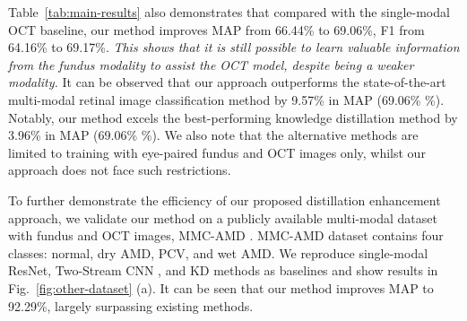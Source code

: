 \documentclass[runningheads]{llncs}
\newcommand{\wdaicmnt}[1]{{\color[rgb]{0.9,0.1,0.1}{(WD:#1)}}}
\newcommand{\xmli}[1]{{\color{red}{[XM: #1]}}}
\begin{document}
Table~\ref{tab:main-results} also demonstrates that compared with the single-modal OCT baseline, our method improves MAP from 66.44\% to 69.06\%, F1 from 64.16\% to 69.17\%.
\textit{This shows that it is still possible to learn valuable information from the fundus modality to assist the OCT model, despite being a weaker modality.} It can be observed that our approach outperforms the state-of-the-art multi-modal retinal image classification method \cite{he2021multi} by 9.57\% in MAP (69.06\% \%). Notably, our method excels the best-performing knowledge distillation method \cite{chen2022knowledge} by 3.96\% in MAP (69.06\% \%).
We also note that the alternative methods are limited to training with eye-paired fundus and OCT images only, whilst our approach does not face such restrictions.

To further demonstrate the efficiency of our proposed distillation enhancement approach, we validate our method on a publicly available multi-modal dataset with fundus and OCT images, MMC-AMD \cite{wang2022learning}. MMC-AMD dataset contains four classes: normal, dry AMD, PCV, and wet AMD. We reproduce single-modal ResNet, Two-Stream CNN \cite{wang2019two}, and KD methods\cite{romero2014fitnets,hinton2015distilling} as baselines and show results in Fig.~\ref{fig:other-dataset} (a). It can be seen that our method improves MAP to 92.29\%, largely surpassing existing methods. 

\end{document}
